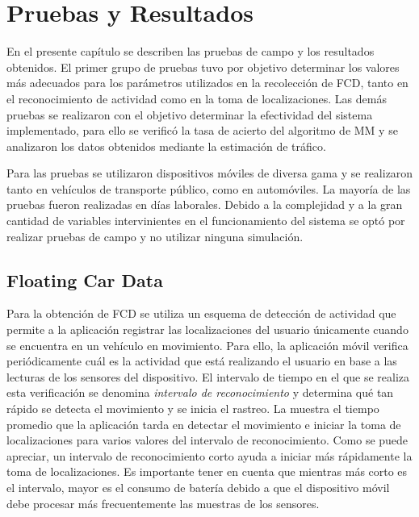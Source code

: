 \chapter{Pruebas y Resultados}
\label{cap:7}

En el presente capítulo se describen las pruebas de campo y los resultados obtenidos. El primer grupo de pruebas tuvo por objetivo determinar los valores más adecuados para los parámetros utilizados en la recolección de FCD, tanto en el reconocimiento de actividad como en la toma de localizaciones. Las demás pruebas se realizaron con el objetivo determinar la efectividad del sistema implementado, para ello se verificó la tasa de acierto del algoritmo de MM y se analizaron los datos obtenidos mediante la estimación de tráfico.

Para las pruebas se utilizaron dispositivos móviles de diversa gama y se realizaron tanto en vehículos de transporte público, como en automóviles. La mayoría de las pruebas fueron realizadas en días laborales. Debido a la complejidad y a la gran cantidad de variables intervinientes en el funcionamiento del sistema se optó por realizar pruebas de campo y no utilizar ninguna simulación.

\section{Floating Car Data}

Para la obtención de FCD se utiliza un esquema de detección de actividad que permite a la aplicación registrar las localizaciones del usuario únicamente cuando se encuentra en un vehículo en movimiento. Para ello, la aplicación móvil verifica periódicamente cuál es la actividad que está realizando el usuario en base a las lecturas de los sensores del dispositivo. El intervalo de tiempo en el que se realiza esta verificación se denomina \emph{intervalo de reconocimiento} y determina qué tan rápido se detecta el movimiento y se inicia el rastreo. La  muestra el tiempo promedio que la aplicación tarda en detectar el movimiento e iniciar la toma de localizaciones para varios valores del intervalo de reconocimiento. Como se puede apreciar, un intervalo de reconocimiento corto ayuda a iniciar más rápidamente la toma de localizaciones. Es importante tener en cuenta que mientras más corto es el intervalo, mayor es el consumo de batería debido a que el dispositivo móvil debe procesar más frecuentemente las muestras de los sensores.

